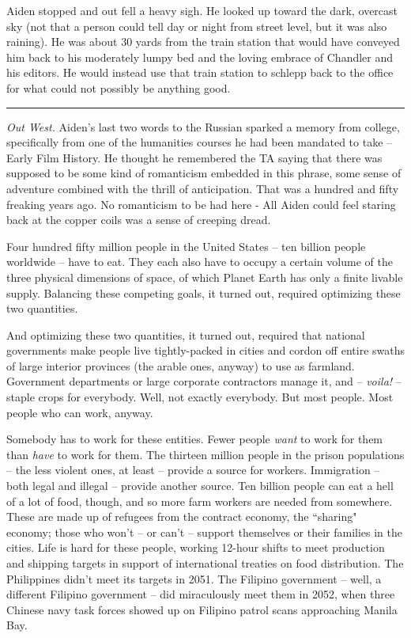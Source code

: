 \documentclass[11pt]{book}
\begin{document}
	Aiden stopped and out fell a heavy sigh. He looked up toward the dark, overcast sky (not that a person could tell day or night from street level, but it was also raining). He was about 30 yards from the train station that would have conveyed him back to his moderately lumpy bed and the loving embrace of Chandler and his editors. He would instead use that train station to schlepp back to the office for what could not possibly be anything good.
	
	\vspace{0.5cm}
	\hrule
	\vspace{0.5cm}
	
	\textit{Out West.} Aiden's last two words to the Russian sparked a memory from college, specifically from one of the humanities courses he had been mandated to take -- Early Film History. He thought he remembered the TA saying that there was supposed to be some kind of romanticism embedded in this phrase, some sense of adventure combined with the thrill of anticipation. That was a hundred and fifty freaking years ago. No romanticism to be had here - All Aiden could feel staring back at the copper coils was a sense of creeping dread.
	
	Four hundred fifty million people in the United States -- ten billion people worldwide -- have to eat. They each also have to occupy a certain volume of the three physical dimensions of space, of which Planet Earth has only a finite livable supply. Balancing these competing goals, it turned out, required optimizing these two quantities.
	
	And optimizing these two quantities, it turned out, required that national governments make people live tightly-packed in cities and cordon off entire swaths of large interior provinces (the arable ones, anyway) to use as farmland. Government departments or large corporate contractors manage it, and -- \textit{voila!} -- staple crops for everybody. Well, not exactly everybody. But most people. Most people who can work, anyway.
	
	Somebody has to work for these entities. Fewer people \textit{want} to work for them than \textit{have} to work for them. The thirteen million people in the prison populations -- the less violent ones, at least -- provide a source for workers. Immigration -- both legal and illegal -- provide another source. Ten billion people can eat a hell of a lot of food, though, and so more farm workers are needed from somewhere. These are made up of refugees from the contract economy, the ``sharing" economy; those who won't -- or can't -- support themselves or their families in the cities. Life is hard for these people, working 12-hour shifts to meet production and shipping targets in support of international treaties on food distribution. The Philippines didn't meet its targets in 2051. The Filipino government -- well, a different Filipino government -- did miraculously meet them in 2052, when three Chinese navy task forces showed up on Filipino patrol scans approaching Manila Bay.
	
\end{document}

